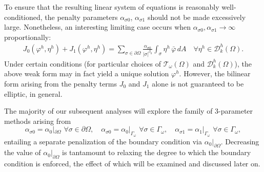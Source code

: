 	To ensure that the resulting linear system of equations is reasonably well-conditioned, the penalty parameters $\alpha_{\sigma0}$, $\alpha_{\sigma1}$ should not be made excessively large. Nonetheless, an interesting limiting case occurs when $\alpha_{\sigma0}, \alpha_{\sigma1} \rightarrow \infty$ proportionally:
	\begin{eqnarray}
		J_0 (\varphi^h,\eta^h) + J_1 (\varphi^h,\eta^h) = \sum_{\sigma \in \partial \Omega} \frac{\alpha_{\sigma0}}{|\sigma|^{\beta_0}} \int_{\sigma} \eta^h \,  \bar{\varphi} \, dA \quad \forall \eta^h \in \mathcal{D}^h_k (\Omega).
		\label{eq:pure_penalty}
	\end{eqnarray}
	Under certain conditions (for particular choices of $\mathcal{T}_\omega (\Omega)$ and $\mathcal{D}^h_k (\Omega)$), the above weak form may in fact yield a unique solution $\varphi^h$. However, the bilinear form arising from the penalty terms $J_0$ and $J_1$ alone is not guaranteed to be elliptic, in general.
	
	The majority of our subsequent analyses will explore the family of 3-parameter methods arising from
	\begin{equation}
		\alpha_{\sigma 0} = \alpha_{0}|_{\partial \Omega} \, \, \forall \sigma \in \partial \Omega, \quad \alpha_{\sigma 0} = \alpha_{0}|_{\Gamma_{\omega}} \, \, \forall \sigma \in \Gamma_{\omega}, \quad \alpha_{\sigma 1} = \alpha_{1}|_{\Gamma_{\omega}} \, \, \forall \sigma \in \Gamma_{\omega},
	\end{equation}
	entailing a separate penalization of the boundary condition via $\alpha_{0}|_{\partial \Omega}$. Decreasing the value of $\alpha_{0}|_{\partial \Omega}$ is tantamount to relaxing the degree to which the boundary condition is enforced, the effect of which will be examined and discussed later on.
	
		
			
